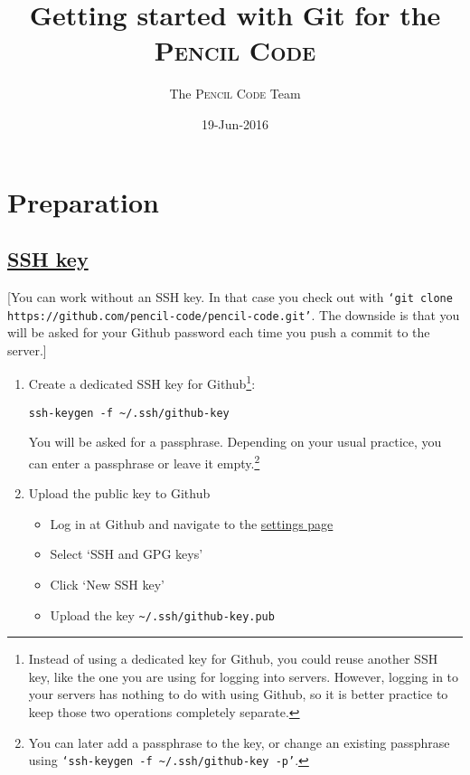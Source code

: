 \documentclass[12pt,pdftex]{article}
\author{The \textsc{Pencil Code} Team}
\date{19-Jun-2016}
\title{Getting started with Git for the \textsc{Pencil Code}}
\begin{document}
\maketitle
\thispagestyle{empty}

\section{Preparation}
\label{sec-1}


\subsection{\href{https://help.github.com/articles/generating-an-ssh-key/}{SSH key}}
\label{sec-1-1}

[You can work without an SSH key.
In that case you check out with
\texttt{‘git clone https://github.com/pencil-code/pencil-code.git’}.
The downside is that you will be asked for your Github password each
time you push a commit to the server.]

\begin{enumerate}
\item Create a dedicated SSH key for Github\footnote{Instead of using a dedicated key for Github, you could reuse another
SSH key, like the one you are using for logging into servers.
However, logging in to your servers has nothing to do with using Github, so
it is better practice to keep those two operations completely separate.}:

\lstset{frame=single,basicstyle=\ttfamily\footnotesize,language=sh,label= ,caption= ,captionpos=b,numbers=none}
\begin{lstlisting}
ssh-keygen -f ~/.ssh/github-key
\end{lstlisting}

You will be asked for a passphrase.
Depending on your usual practice, you can enter a passphrase or
leave it empty.\footnote{You can later add a passphrase to the key, or change an existing
passphrase using \texttt{‘ssh-keygen -f \textasciitilde{}/.ssh/github-key -p’}.}

\item Upload the public key to Github 
\begin{itemize}
\item Log in at Github and navigate to the \href{https://github.com/settings/profile}{settings page}
\item Select ‘SSH and GPG keys’
\item Click ‘New SSH key’
\item Upload the key \texttt{\textasciitilde{}/.ssh/github-key.pub}
\end{itemize}
\end{enumerate}
\end{document}
